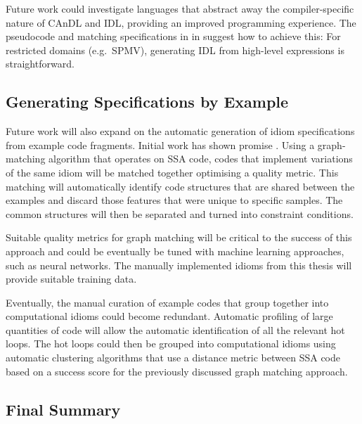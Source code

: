     Future work could investigate languages that abstract away the
    compiler-specific nature of CAnDL and IDL, providing an improved programming
    experience.
    The pseudocode and matching specifications in
     in  suggest
    how to achieve this:
    For restricted domains (e.g.\ SPMV), generating IDL from high-level
    expressions is straightforward.

\subsection*{Generating Specifications by Example}

    Future work will also expand on the automatic generation of idiom
    specifications from example code fragments.
    Initial work has shown promise \citep{DBLP:conf/IEEEpact/CollieGO19}.
    Using a graph-matching algorithm that operates on SSA code, codes that
    implement variations of the same idiom will be matched together optimising
    a quality metric.
    This matching will automatically identify code structures that are shared
    between the examples and discard those features that were unique to
    specific samples.
    The common structures will then be separated and turned into constraint
    conditions.

    Suitable quality metrics for graph matching will be critical to the success
    of this approach and could be eventually be tuned with machine learning
    approaches, such as neural networks.
    The manually implemented idioms from this thesis will provide suitable
    training data.

    Eventually, the manual curation of example codes that group together into
    computational idioms could become redundant.
    Automatic profiling of large quantities of code will allow the automatic
    identification of all the relevant hot loops.
    The hot loops could then be grouped into computational idioms using
    automatic clustering algorithms that use a distance metric between SSA code
    based on a success score for the previously discussed graph matching
    approach.

\subsection*{Final Summary}
